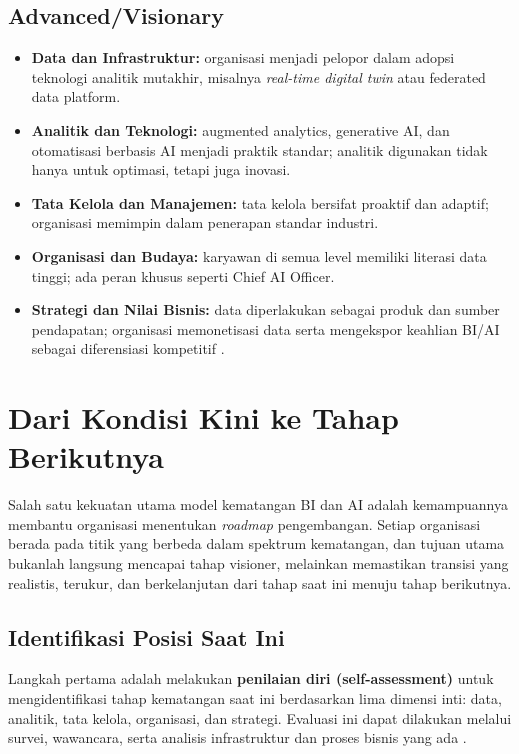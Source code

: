 \subsection{Advanced/Visionary}
\begin{itemize}
	\item \textbf{Data dan Infrastruktur:} organisasi menjadi pelopor dalam adopsi teknologi analitik mutakhir, misalnya \textit{real-time digital twin} atau federated data platform.
	\item \textbf{Analitik dan Teknologi:} augmented analytics, generative AI, dan otomatisasi berbasis AI menjadi praktik standar; analitik digunakan tidak hanya untuk optimasi, tetapi juga inovasi.
	\item \textbf{Tata Kelola dan Manajemen:} tata kelola bersifat proaktif dan adaptif; organisasi memimpin dalam penerapan standar industri.
	\item \textbf{Organisasi dan Budaya:} karyawan di semua level memiliki literasi data tinggi; ada peran khusus seperti Chief AI Officer.
	\item \textbf{Strategi dan Nilai Bisnis:} data diperlakukan sebagai produk dan sumber pendapatan; organisasi memonetisasi data serta mengekspor keahlian BI/AI sebagai diferensiasi kompetitif \cite{chen2021aibi, gantz2020futurebi}.
\end{itemize}


\section{Dari Kondisi Kini ke Tahap Berikutnya}

Salah satu kekuatan utama model kematangan BI dan AI adalah kemampuannya membantu organisasi 
menentukan \textit{roadmap} pengembangan. Setiap organisasi berada pada titik yang berbeda dalam 
spektrum kematangan, dan tujuan utama bukanlah langsung mencapai tahap visioner, 
melainkan memastikan transisi yang realistis, terukur, dan berkelanjutan dari tahap saat ini 
menuju tahap berikutnya.

\subsection*{Identifikasi Posisi Saat Ini}
Langkah pertama adalah melakukan \textbf{penilaian diri (self-assessment)} untuk mengidentifikasi 
tahap kematangan saat ini berdasarkan lima dimensi inti: data, analitik, tata kelola, organisasi, 
dan strategi. Evaluasi ini dapat dilakukan melalui survei, wawancara, serta analisis infrastruktur 
dan proses bisnis yang ada \cite{alsai2023}.  

